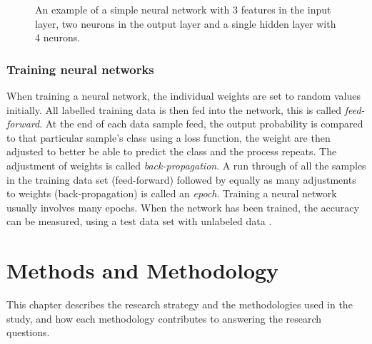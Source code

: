 \documentclass[12pt, a4paper, onecolumn]{article}
\begin{document}
	\begin{figure}[H]
		\centering
		\caption{An example of a simple neural network with 3 features in the input layer, two neurons in the output layer and a single hidden layer with 4 neurons.}%
		\label{fig:neural-network-overview}%
	\end{figure} 
	
	\subsubsection{Training neural networks}
	When training a neural network, the individual weights are set to random values initially. All labelled training data is then fed into the network, this is called \textit{feed-forward}. At the end of each data sample feed, the output probability is compared to that particular sample's class using a loss function, the weight are then adjusted to better be able to predict the class and the process repeats. The adjustment of weights is called \textit{back-propagation}. A run through of all the samples in the training data set (feed-forward) followed by equally as many adjustments to weights (back-propagation) is called an \textit{epoch}. Training a neural network usually involves many epochs. When the network has been trained, the accuracy can be measured, using a test data set with unlabeled data \cite{neural_networks}.
	
	
	\newpage
	\section{Methods and Methodology} \label{section:methods}
	
	This chapter describes the research strategy and the methodologies used in the study, and how each methodology contributes to answering the research questions.
	
\end{document}
